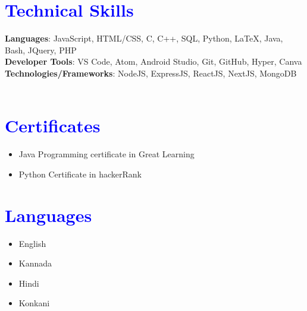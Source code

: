 \documentclass[letterpaper,11pt]{article}
\newcommand{\resumeItem}[1]{
  \item\small{
    {#1 \vspace{-2pt}}
  }
}
\newcommand{\resumeItemListStart}{\begin{itemize}}
\newcommand{\resumeItemListEnd}{\end{itemize}\vspace{-5pt}}
\begin{document}
        \section{\textcolor{blue}{Technical Skills}}
            \vspace{2pt}
        \begin{itemize}[leftmargin=0.0in, label={}]
              \normalsize{\item{
              \textbf{Languages}{: JavaScript, HTML/CSS, C, C++, SQL, Python, LaTeX, Java, Bash, JQuery, PHP} \\
        	 \vspace{4pt}
              \textbf{Developer Tools}{: VS Code, Atom, Android Studio, Git, GitHub, Hyper, Canva} \\
        	\vspace{4pt}
              \textbf{Technologies/Frameworks}{: NodeJS, ExpressJS, ReactJS, NextJS, MongoDB} \\
            \vspace{4pt}
              \
            }}
        \section{\textcolor{blue}{Certificates}}
            \resumeItemListStart
                \resumeItem{Java Programming certificate in Great Learning}
                \resumeItem{Python Certificate in hackerRank}
              \resumeItemListEnd
        \section{\textcolor{blue}{Languages}}
            \resumeItemListStart
                \resumeItem{English}
                \resumeItem{Kannada}
                \resumeItem{Hindi}
                \resumeItem{Konkani}


              \resumeItemListEnd
        \end{itemize}
    
\end{document}

